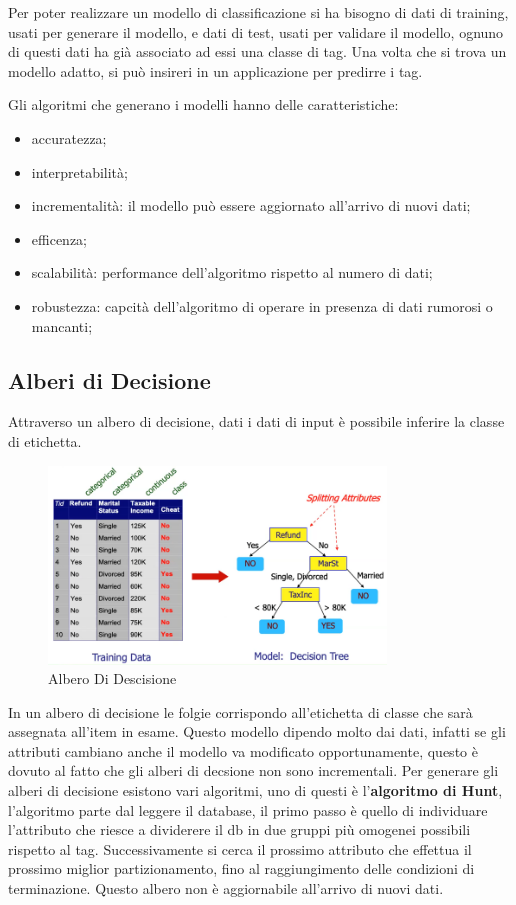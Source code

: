 \documentclass[12pt]{article}
\begin{document}
Per poter realizzare un modello di classificazione si ha bisogno di dati di training, usati per generare il modello, e dati di test, usati per validare il modello, ognuno di questi dati ha gi\`a associato ad essi una classe di tag. Una volta che si trova un modello adatto, si pu\`o insireri in un applicazione per predirre i tag.

Gli algoritmi che generano i modelli hanno delle caratteristiche:
\begin{itemize}
    \item accuratezza;
    \item interpretabilit\`a;
    \item incrementalit\`a: il modello pu\`o essere aggiornato all'arrivo di nuovi dati;
    \item efficenza;
    \item scalabilit\`a: performance dell'algoritmo rispetto al numero di dati;
    \item robustezza: capcit\`a dell'algoritmo di operare in presenza di dati rumorosi o mancanti;
\end{itemize}

\subsection{Alberi di Decisione}
Attraverso un albero di decisione, dati i dati di input \`e possibile inferire la classe di etichetta.
\begin{figure}[H]
    \centering
    \includegraphics[width=0.8\textwidth]{albero-di-descisione.png}
    \caption{Albero Di Descisione}
    \label{fig:albero-di-descisione}
\end{figure}
In un albero di decisione le folgie corrispondo all'etichetta di classe che sar\`a assegnata all'item in esame. Questo modello dipendo molto dai dati, infatti se gli attributi cambiano anche il modello va modificato opportunamente, questo \`e dovuto al fatto che gli alberi di decsione non sono incrementali. Per generare gli alberi di decisione esistono vari algoritmi, uno di questi \`e l'\textbf{algoritmo di Hunt}, l'algoritmo parte dal leggere il database, il primo passo \`e quello di individuare l'attributo che riesce a dividerere il db in due gruppi pi\`u omogenei possibili rispetto al tag. Successivamente si cerca il prossimo attributo che effettua il prossimo miglior partizionamento, fino al raggiungimento delle condizioni di terminazione. Questo albero non \`e aggiornabile all'arrivo di nuovi dati.
\end{document}
